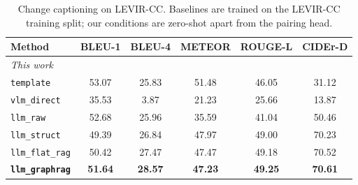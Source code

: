 \begin{table}[t]
\centering
\caption{Change captioning on LEVIR-CC. Baselines are trained on the LEVIR-CC training split; our conditions are zero-shot apart from the pairing head.}
\label{tab:levir_cc_caption}
\setlength{\tabcolsep}{3pt}
\begin{tabular}{lccccc}
\toprule
Method & BLEU-1 & BLEU-4 & METEOR & ROUGE-L & CIDEr-D \\
\midrule
\midrule
\multicolumn{6}{l}{\emph{This work}} \\
\texttt{template} & 53.07 & 25.83 & 51.48 & 46.05 & 31.12 \\
\texttt{vlm\_direct} & 35.53 & 3.87 & 21.23 & 25.66 & 13.87 \\
\texttt{llm\_raw} & 52.68 & 25.96 & 35.59 & 41.04 & 50.46 \\
\texttt{llm\_struct} & 49.39 & 26.84 & 47.97 & 49.00 & 70.23 \\
\texttt{llm\_flat\_rag} & 50.42 & 27.47 & 47.47 & 49.18 & 70.52 \\
\textbf{\texttt{llm\_graphrag}} & \textbf{51.64} & \textbf{28.57} & \textbf{47.23} & \textbf{49.25} & \textbf{70.61} \\
\bottomrule
\end{tabular}
\end{table}
